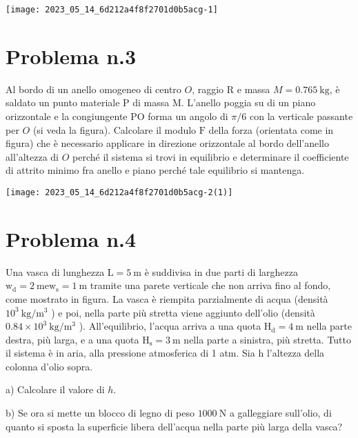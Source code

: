 \documentclass[10pt]{article}
\begin{document}
\begin{center}
\texttt{[image: 2023\_05\_14\_6d212a4f8f2701d0b5acg-1]}
\end{center}

\section{Problema n.3}
Al bordo di un anello omogeneo di centro \(O\), raggio \(\mathrm{R}\) e massa \(M=0.765 \mathrm{~kg}\), è saldato un punto materiale \(\mathrm{P}\) di massa M. L'anello poggia su di un piano orizzontale e la congiungente PO forma un angolo di \(\pi / 6\) con la verticale passante per \(O\) (si veda la figura). Calcolare il modulo \(\mathrm{F}\) della forza (orientata come in figura) che è necessario applicare in direzione orizzontale al bordo dell'anello all'altezza di \(O\) perché il sistema si trovi in equilibrio e determinare il coefficiente di attrito minimo fra anello e piano perché tale equilibrio si mantenga.

\begin{center}
\texttt{[image: 2023\_05\_14\_6d212a4f8f2701d0b5acg-2(1)]}
\end{center}

\section{Problema n.4}
Una vasca di lunghezza \(\mathrm{L}=5 \mathrm{~m}\) è suddivisa in due parti di larghezza \(\mathrm{w}_{\mathrm{d}}=2 \mathrm{~m} \mathrm{e} \mathrm{w}_{\mathrm{s}}=1 \mathrm{~m}\) tramite una parete verticale che non arriva fino al fondo, come mostrato in figura. La vasca è riempita parzialmente di acqua (densità \(10^{3} \mathrm{~kg} / \mathrm{m}^{3}\) ) e poi, nella parte più stretta viene aggiunto dell'olio (densità \(0.84 \times 10^{3} \mathrm{~kg} / \mathrm{m}^{3}\) ). All'equilibrio, l'acqua arriva a una quota \(\mathrm{H}_{\mathrm{d}}=4 \mathrm{~m}\) nella parte destra, più larga, e a una quota \(\mathrm{H}_{\mathrm{s}}=3 \mathrm{~m}\) nella parte a sinistra, più stretta. Tutto il sistema è in aria, alla pressione atmosferica di 1 atm. Sia \(\mathrm{h}\) l'altezza della colonna d'olio sopra.

a) Calcolare il valore di \(h\).

b) Se ora si mette un blocco di legno di peso \(1000 \mathrm{~N}\) a galleggiare sull'olio, di quanto si sposta la superficie libera dell'acqua nella parte più larga della vasca?
\end{document}
